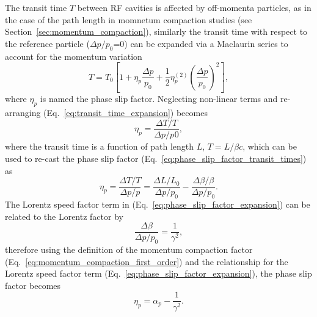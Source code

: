 \documentclass[../main.tex]{subfiles}
\begin{document}
The transit time $T$ between RF cavities is affected by off-momenta particles, as in the case of the path length in momnetum compaction studies (see Section~\ref{sec:momentum_compaction}), similarly the transit time with respect to the reference particle ($\Delta p/p_{0}$=0) can be expanded via a Maclaurin series to account for the momentum variation
\begin{equation}
T = T_{0}\left[1+\eta_{p}\frac{\Delta p}{p_{0}}+\frac{1}{2}\eta_{p}^{\left(2\right)}\left(\frac{\Delta p}{p_{0}}\right)^{2}\right],
\label{eq:transit_time_expansion}    
\end{equation}
where $\eta_{p}$ is named the phase slip factor. Neglecting non-linear terms and re-arranging (Eq.~\ref{eq:transit_time_expansion}) becomes
\begin{equation}
\eta_{p} = \frac{\Delta T/T}{\Delta p/p_{}0},
\label{eq:phase_slip_factor_transit_time}    
\end{equation}
where the transit time is a function of path length $L$, $T = L/\beta c$, which can be used to re-cast the phase slip factor (Eq.~\ref{eq:phase_slip_factor_transit_times}) as  
\begin{equation}
\eta_{p} = \frac{\Delta T/T}{\Delta p/p} = \frac{\Delta L/L_{0}}{\Delta p/p_{0}}-\frac{\Delta\beta/\beta}{\Delta p/p_{0}}.
\label{eq:phase_slip_factor_expansion}    
\end{equation}
The Lorentz speed factor term in (Eq.~\ref{eq:phase_slip_factor_expansion}) can be related to the Lorentz factor \cite{wolski2012longitudinal} by 
\begin{equation}
\frac{\Delta \beta}{\Delta p/p_{0}} = \frac{1}{\gamma^{2}},
\label{eq:phase_slip_Lorentz_relation}    
\end{equation}
therefore using the definition of the momentum compaction factor (Eq.~\ref{eq:momentum_compaction_first_order}) and the relationship for the Lorentz speed factor term (Eq.~\ref{eq:phase_slip_factor_expansion}), the phase slip factor becomes
\begin{equation}
\eta_{p} = \alpha_{p} - \frac{1}{\gamma^{2}}.
\label{eq:phase_slip_factor}    
\end{equation}
\end{document}
